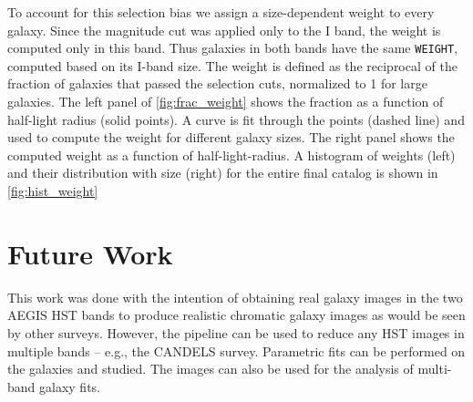 \documentclass[a4paper,11pt]{article}
\begin{document}
To account for this selection bias we assign a size-dependent weight to every galaxy. Since the magnitude cut was applied only to the I band, the weight is computed only in this band. Thus galaxies in both bands have the same {\tt WEIGHT}, computed based on its I-band size. The weight is defined as the reciprocal of the fraction of galaxies that passed the selection cuts, normalized to 1 for large galaxies. The left panel of \autoref{fig:frac_weight} shows the fraction as a function of half-light radius (solid points). A curve is fit through the points (dashed line) and used to compute the weight for different galaxy sizes. The right panel shows the computed weight as a function of half-light-radius. A histogram of weights (left) and their distribution with size (right) for the entire final catalog is shown in \autoref{fig:hist_weight}


\section{Future Work}
This work was done with the intention of obtaining real galaxy images in the two AEGIS HST bands to produce realistic chromatic galaxy images as would be seen by other surveys. However, the pipeline can be used to reduce any HST images in multiple bands -- e.g., the CANDELS survey. Parametric fits can be performed on the galaxies and studied. The images can also be used for the analysis of multi-band galaxy fits.
\end{document}

